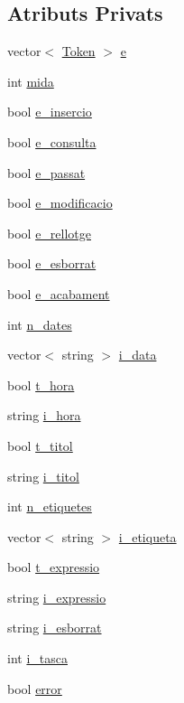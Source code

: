 \subsection*{Atributs Privats}
\begin{DoxyCompactItemize}
\item 
vector$<$ \hyperlink{class_token}{Token} $>$ \hyperlink{class_comanda_a4792137ffe62e366d017c085798e1de7}{e}
\item 
int \hyperlink{class_comanda_abaf613f247586557027ad5857ace89c2}{mida}
\item 
bool \hyperlink{class_comanda_afa50474d0c9c08da1f3042cfddc9df24}{e\-\_\-insercio}
\item 
bool \hyperlink{class_comanda_a558a2944c2306c12df9f889fc96a58dd}{e\-\_\-consulta}
\item 
bool \hyperlink{class_comanda_a38e7cdf2003076cbe88461f03dc2106c}{e\-\_\-passat}
\item 
bool \hyperlink{class_comanda_a96d917429f6bfa73608d745ad1e1dfc7}{e\-\_\-modificacio}
\item 
bool \hyperlink{class_comanda_ad73910246f9c47c887a3c01b53350282}{e\-\_\-rellotge}
\item 
bool \hyperlink{class_comanda_a70a9790e90a45015dbcd4c6700ec0812}{e\-\_\-esborrat}
\item 
bool \hyperlink{class_comanda_a0f7472af37d7f6c24f74fbac60e4a696}{e\-\_\-acabament}
\item 
int \hyperlink{class_comanda_a0a4e13d8edba10c69d1b058d8fc6a7c3}{n\-\_\-dates}
\item 
vector$<$ string $>$ \hyperlink{class_comanda_a06ee1d3173ee0ae52c588689e9263099}{i\-\_\-data}
\item 
bool \hyperlink{class_comanda_ae481194a2016e940e655173e897d214d}{t\-\_\-hora}
\item 
string \hyperlink{class_comanda_a480a34460b3668a5b4a1fa7e796632db}{i\-\_\-hora}
\item 
bool \hyperlink{class_comanda_a08e8674396e2125cf8b2900f289713a7}{t\-\_\-titol}
\item 
string \hyperlink{class_comanda_aca04e90eab5ac14ddc3b25f154aabe48}{i\-\_\-titol}
\item 
int \hyperlink{class_comanda_a1e525815f0745140e05da2ebb96ec39a}{n\-\_\-etiquetes}
\item 
vector$<$ string $>$ \hyperlink{class_comanda_a1d193f66ea6d2681ab79a16192da3114}{i\-\_\-etiqueta}
\item 
bool \hyperlink{class_comanda_ac7037525fc1cd9f49b02bd87cf4b6123}{t\-\_\-expressio}
\item 
string \hyperlink{class_comanda_a9236cdc5142b6a9f4116673abce06508}{i\-\_\-expressio}
\item 
string \hyperlink{class_comanda_a269a43d5b283a23792791a2ba67747b0}{i\-\_\-esborrat}
\item 
int \hyperlink{class_comanda_aab152fe48a937f449c027a2274fc31e7}{i\-\_\-tasca}
\item 
bool \hyperlink{class_comanda_a9a1bf4bf74940a4bac90140e67d11972}{error}
\end{DoxyCompactItemize}
